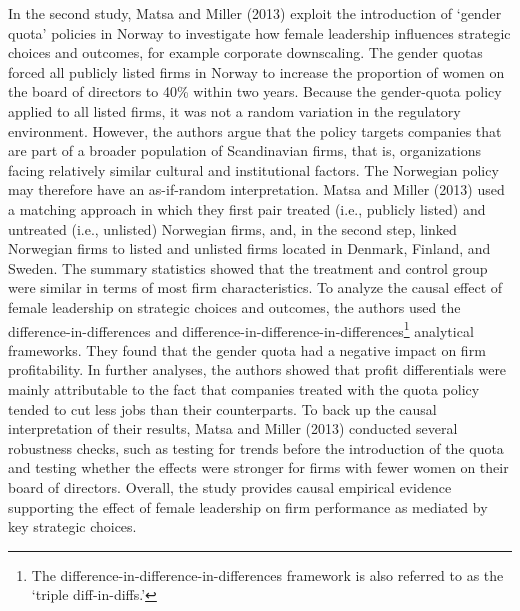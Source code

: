 \documentclass[english]{article}
\begin{document}
In the second study, Matsa and Miller (2013) exploit the introduction of
`gender quota' policies in Norway to investigate how female leadership
influences strategic choices and outcomes, for example corporate
downscaling. The gender quotas forced all publicly listed firms in
Norway to increase the proportion of women on the board of directors to
40\% within two years. Because the gender-quota policy applied to all
listed firms, it was not a random variation in the regulatory
environment. However, the authors argue that the policy targets
companies that are part of a broader population of Scandinavian firms,
that is, organizations facing relatively similar cultural and
institutional factors. The Norwegian policy may therefore have an
as-if-random interpretation. Matsa and Miller (2013) used a matching
approach in which they first pair treated (i.e., publicly listed) and
untreated (i.e., unlisted) Norwegian firms, and, in the second step,
linked Norwegian firms to listed and unlisted firms located in Denmark,
Finland, and Sweden. The summary statistics showed that the treatment
and control group were similar in terms of most firm characteristics. To
analyze the causal effect of female leadership on strategic choices and
outcomes, the authors used the difference-in-differences and
difference-in-difference-in-differences\footnote{The
  difference-in-difference-in-differences framework is also referred to
  as the `triple diff-in-diffs.'} analytical frameworks. They found that
the gender quota had a negative impact on firm profitability. In further
analyses, the authors showed that profit differentials were mainly
attributable to the fact that companies treated with the quota policy
tended to cut less jobs than their counterparts. To back up the causal
interpretation of their results, Matsa and Miller (2013) conducted
several robustness checks, such as testing for trends before the
introduction of the quota and testing whether the effects were stronger
for firms with fewer women on their board of directors. Overall, the
study provides causal empirical evidence supporting the effect of female
leadership on firm performance as mediated by key strategic choices.
\end{document}
